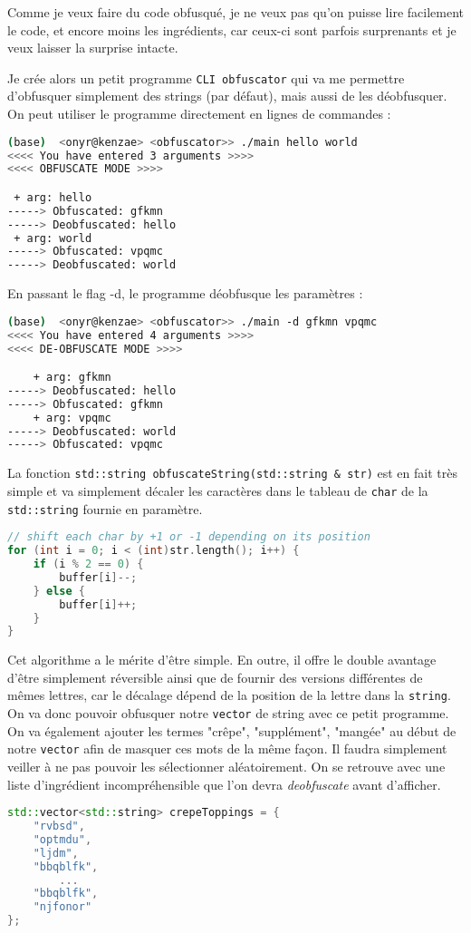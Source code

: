 \documentclass[12pt]{article} %
\begin{document}
Comme je veux faire du code obfusqué, je ne veux pas qu'on puisse lire facilement le code, et encore moins les ingrédients, car ceux-ci sont parfois surprenants et je veux laisser la surprise intacte.

Je crée alors un petit programme \verb|CLI obfuscator| qui va me permettre d'obfusquer simplement des strings (par défaut), mais aussi de les déobfusquer. On peut utiliser le programme directement en lignes de commandes :
\begin{lstlisting}[language=sh]
(base)  <onyr@kenzae> <obfuscator>> ./main hello world
<<<< You have entered 3 arguments >>>>
<<<< OBFUSCATE MODE >>>>

 + arg: hello
-----> Obfuscated: gfkmn
-----> Deobfuscated: hello
 + arg: world
-----> Obfuscated: vpqmc
-----> Deobfuscated: world
\end{lstlisting}

En passant le flag -d, le programme déobfusque les paramètres :
\begin{lstlisting}[language=sh]
(base)  <onyr@kenzae> <obfuscator>> ./main -d gfkmn vpqmc
<<<< You have entered 4 arguments >>>>
<<<< DE-OBFUSCATE MODE >>>>

    + arg: gfkmn
-----> Deobfuscated: hello
-----> Obfuscated: gfkmn
    + arg: vpqmc
-----> Deobfuscated: world
-----> Obfuscated: vpqmc
\end{lstlisting}

La fonction \verb|std::string obfuscateString(std::string & str)| est en fait très simple et va simplement décaler les caractères dans le tableau de \verb|char| de la \verb|std::string| fournie en paramètre.
\begin{lstlisting}[language=C++]
// shift each char by +1 or -1 depending on its position
for (int i = 0; i < (int)str.length(); i++) {
    if (i % 2 == 0) {
        buffer[i]--;
    } else {
        buffer[i]++;
    }
}
\end{lstlisting}

Cet algorithme a le mérite d'être simple. En outre, il offre le double avantage d'être simplement réversible ainsi que de fournir des versions différentes de mêmes lettres, car le décalage dépend de la position de la lettre dans la \verb|string|. On va donc pouvoir obfusquer notre \verb|vector| de string avec ce petit programme. On va également ajouter les termes "crêpe", "supplément", "mangée" au début de notre \verb|vector| afin de masquer ces mots de la même façon. Il faudra simplement veiller à ne pas pouvoir les sélectionner aléatoirement. On se retrouve avec une liste d'ingrédient incompréhensible que l'on devra \textit{deobfuscate} avant d'afficher.
\begin{lstlisting}[language=C++]
std::vector<std::string> crepeToppings = {
    "rvbsd",
    "optmdu",
    "ljdm",
    "bbqblfk",
        ...
    "bbqblfk",
    "njfonor"
};
\end{lstlisting}
\end{document}
